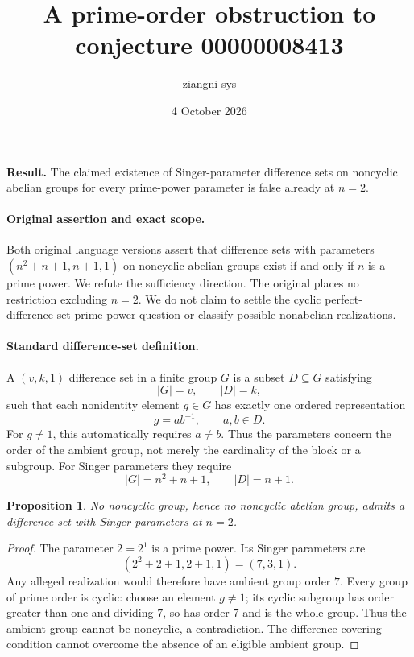 \documentclass[11pt]{article}
\title{A prime-order obstruction to conjecture 00000008413}
\author{ziangni-sys}
\date{4 October 2026}
\newtheorem{proposition}{Proposition}
\begin{document}
\raggedright
\maketitle
\noindent\textbf{Result.} The claimed existence of Singer-parameter difference sets on noncyclic abelian groups for every prime-power parameter is false already at \(n=2\).

\paragraph{Original assertion and exact scope.}
Both original language versions assert that difference sets with parameters
\((n^2+n+1,n+1,1)\) on noncyclic abelian groups exist if and only if \(n\) is a prime power. We refute the sufficiency direction. The original places no restriction excluding \(n=2\). We do not claim to settle the cyclic perfect-difference-set prime-power question or classify possible nonabelian realizations.

\paragraph{Standard difference-set definition.}
A \((v,k,1)\) difference set in a finite group \(G\) is a subset \(D\subseteq G\) satisfying
\[
 |G|=v,\qquad |D|=k,
\]
such that each nonidentity element \(g\in G\) has exactly one ordered representation
\[
 g=ab^{-1},\qquad a,b\in D.
\]
For \(g\ne1\), this automatically requires \(a\ne b\).
Thus the parameters concern the order of the ambient group, not merely the cardinality of the block or a subgroup. For Singer parameters they require
\[
 |G|=n^2+n+1,\qquad |D|=n+1.
\]

\begin{proposition}
No noncyclic group, hence no noncyclic abelian group, admits a difference set with Singer parameters at \(n=2\).
\end{proposition}
\begin{proof}
The parameter \(2=2^1\) is a prime power. Its Singer parameters are
\[
 (2^2+2+1,2+1,1)=(7,3,1).
\]
Any alleged realization would therefore have ambient group order \(7\).
Every group of prime order is cyclic: choose an element \(g\ne1\); its cyclic subgroup has order greater than one and dividing \(7\), so has order \(7\) and is the whole group. Thus the ambient group cannot be noncyclic, a contradiction. The difference-covering condition cannot overcome the absence of an eligible ambient group.
\end{proof}
\end{document}
